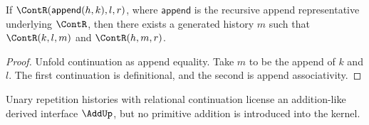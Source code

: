 \begin{theorem}
\label{thm:cont-left-append-decompose}
If $\ContR(\mathsf{append}(h,k),l,r)$, where $\mathsf{append}$ is the recursive append representative underlying $\ContR$, then there exists a generated history $m$ such that $\ContR(k,l,m)$ and $\ContR(h,m,r)$.
\end{theorem}
\begin{proof}
Unfold continuation as append equality. Take \(m\) to be the append of \(k\) and \(l\). The first continuation is definitional, and the second is append associativity.
\end{proof}

\begin{corollary}
\label{cor:continuation-addition-like-seed}
Unary repetition histories with relational continuation license an addition-like derived interface \(\AddUp\), but no primitive addition is introduced into the kernel.
\end{corollary}
